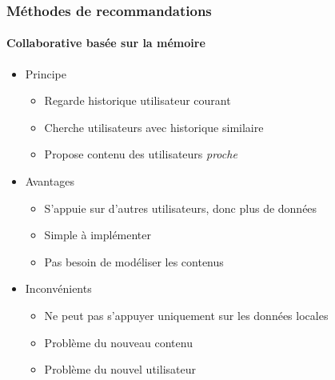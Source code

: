 \documentclass[a4,11pt,sans]{beamer}
\begin{document}
    \begin{frame}
        \frametitle{M\'ethodes de recommandations}
        \framesubtitle{Collaborative bas\'ee sur la m\'emoire}

        \begin{itemize}
            \item Principe
                \begin{itemize}
                    \item Regarde historique utilisateur courant
                    \item Cherche utilisateurs avec historique similaire
                    \item Propose contenu des utilisateurs \emph{proche}
                \end{itemize}
            \item Avantages
                \begin{itemize}
                    \item S'appuie sur d'autres utilisateurs, donc plus
                        de donn\'ees
                    \item Simple à impl\'ementer
                    \item Pas besoin de mod\'eliser les contenus
                \end{itemize}
            \item Inconv\'enients
                \begin{itemize}
                    \item Ne peut pas s'appuyer uniquement sur les donn\'ees
                        locales
                    \item Problème du nouveau contenu
                    \item Problème du nouvel utilisateur
                \end{itemize}
        \end{itemize}
    \end{frame}
\end{document}
